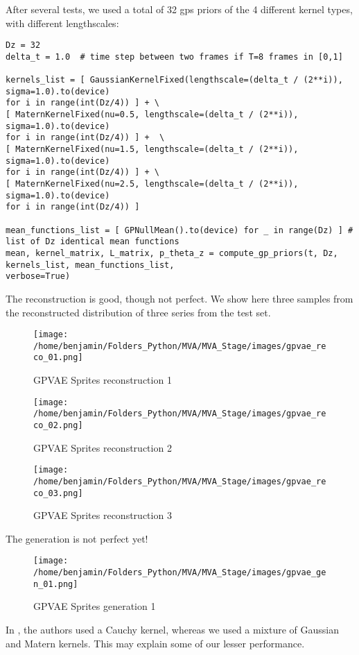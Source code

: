 After several tests, we used a total of 32 \glspl{gp} priors of the 4 different kernel types, with different lengthscales:
\begin{verbatim}
Dz = 32
delta_t = 1.0  # time step between two frames if T=8 frames in [0,1]

kernels_list = [ GaussianKernelFixed(lengthscale=(delta_t / (2**i)), sigma=1.0).to(device) 
for i in range(int(Dz/4)) ] + \
[ MaternKernelFixed(nu=0.5, lengthscale=(delta_t / (2**i)), sigma=1.0).to(device) 
for i in range(int(Dz/4)) ] +  \
[ MaternKernelFixed(nu=1.5, lengthscale=(delta_t / (2**i)), sigma=1.0).to(device) 
for i in range(int(Dz/4)) ] + \
[ MaternKernelFixed(nu=2.5, lengthscale=(delta_t / (2**i)), sigma=1.0).to(device) 
for i in range(int(Dz/4)) ]

mean_functions_list = [ GPNullMean().to(device) for _ in range(Dz) ] # list of Dz identical mean functions
mean, kernel_matrix, L_matrix, p_theta_z = compute_gp_priors(t, Dz, kernels_list, mean_functions_list, 
verbose=True)
\end{verbatim}

The reconstruction is good, though not perfect. We show here three samples from the reconstructed distribution of three series from the test set. 
\begin{figure}[H]
    \centering
    \texttt{[image: /home/benjamin/Folders\_Python/MVA/MVA\_Stage/images/gpvae\_reco\_01.png]}
    \caption{GPVAE Sprites reconstruction 1}
    \label{fig:GPVAE Sprites reconstruction 1}
\end{figure}

\begin{figure}[H]
    \centering
    \texttt{[image: /home/benjamin/Folders\_Python/MVA/MVA\_Stage/images/gpvae\_reco\_02.png]}
    \caption{GPVAE Sprites reconstruction 2}
    \label{fig:GPVAE Sprites reconstruction 2}
\end{figure}

\begin{figure}[H]
    \centering
    \texttt{[image: /home/benjamin/Folders\_Python/MVA/MVA\_Stage/images/gpvae\_reco\_03.png]}
    \caption{GPVAE Sprites reconstruction 3}
    \label{fig:GPVAE Sprites reconstruction 3}
\end{figure}

The generation is not perfect yet!

\begin{figure}[H]
    \centering
    \texttt{[image: /home/benjamin/Folders\_Python/MVA/MVA\_Stage/images/gpvae\_gen\_01.png]}
    \caption{GPVAE Sprites generation 1}
    \label{fig:GPVAE Sprites generation 1}
\end{figure}

In \cite{li_disentangled_2018}, the authors used a Cauchy kernel, whereas we used a mixture of Gaussian and Matern kernels.
This may explain some of our lesser performance.